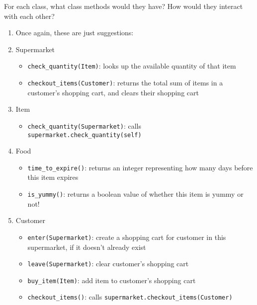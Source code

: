 \begin{blocksection}
\question For each class, what class methods would they have? How would they interact with each other?
\begin{solution}[1.5in]
\begin{enumerate}[1.]
\item Once again, these are just suggestions:
\item Supermarket
\begin{itemize}
    \setlength\itemsep{-0.25em}
    \item \lstinline{check_quantity(Item)}: looks up the available quantity of that item
    \item \lstinline{checkout_items(Customer)}: returns the total sum of items in a customer's shopping cart, and clears their shopping cart
\end{itemize}
\item Item
\begin{itemize}
    \item \lstinline{check_quantity(Supermarket)}: calls \lstinline{supermarket.check_quantity(self)}
\end{itemize}
\item Food
\begin{itemize}
    \setlength\itemsep{-0.5em}
    \item \lstinline{time_to_expire()}: returns an integer representing how many days before this item expires
    \item \lstinline{is_yummy()}: returns a boolean value of whether this item is yummy or not!
\end{itemize}
\item Customer
\begin{itemize}
    \item \lstinline{enter(Supermarket)}: create a shopping cart for customer in this supermarket, if it doesn't already exist
    \item \lstinline{leave(Supermarket)}: clear customer's shopping cart
    \item \lstinline{buy_item(Item)}: add item to customer's shopping cart
    \item \lstinline{checkout_items()}: calls \lstinline{supermarket.checkout_items(Customer)}
\end{itemize}
\end{enumerate}
\end{solution}

\end{blocksection}


